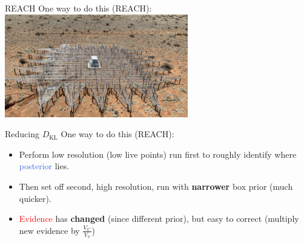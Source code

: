 \documentclass[aspectratio=169, 11pt]{beamer}
\begin{document}
\begin{frame}{REACH}
\vspace{2em}
One way to do this (REACH):
\vfill
\centering
\includegraphics[width=0.6\textwidth]{Ca_Foscari Beamer/antenna.png}

\end{frame}

\begin{frame}{Reducing $D_{\textrm{KL}}$}
\vspace{3.5em}
One way to do this (REACH):

\begin{minipage}[]{0.45\textwidth}\vspace{22em}
\end{minipage}
\begin{minipage}{0.45\textwidth}\vspace{-8em}
\begin{itemize}
    \item<1-> Perform low resolution (low live points) run first to roughly identify where \textcolor{RoyalBlue}{posterior} lies.
    \item<2-> Then set off second, high resolution, run with \textbf{narrower} box \textcolor{BurntOrange}{prior} (much quicker).
    \item<3-> \textcolor{red}{Evidence} has \textbf{changed} (since different prior), but easy to correct (multiply new evidence by $\frac{V_{\pi^\ast}}{V_\pi}$)
\end{itemize}
\end{minipage}

\end{frame}
\end{document}
